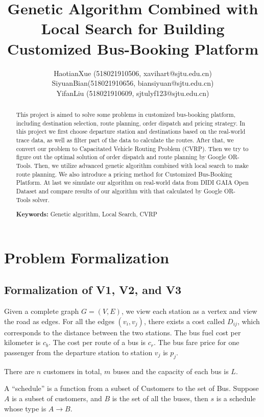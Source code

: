 \documentclass{llncs}
\title{Genetic Algorithm Combined with Local Search for Building Customized Bus-Booking Platform}
\author{HaotianXue (518021910506, xavihart@sjtu.edu.cn) \\ 
SiyuanBian(518021910656, biansiyuan@sjtu.edu.cn) \\
YifanLiu (518021910609, sjtulyf123@sjtu.edu.cn)}
\institute{Department of Computer Science, \\ Shanghai Jiao Tong University, Shanghai, China}
\begin{document}



\maketitle
\begin{abstract}\vspace{-5mm}
This project is aimed to solve some problems in customized bus-booking platform, including destination selection, route planning, order dispatch and pricing strategy. In this project we first choose departure station and destinations based on the real-world trace data, as well as filter part of the data to calculate the routes. After that, we convert our problem to Capacitated Vehicle Routing Problem (CVRP). Then we try to figure out the optimal solution of order dispatch and route planning by Google OR-Tools. Then, we utilize advanced genetic algorithm combined with local search to make route planning. We also introduce a pricing method for Customized Bus-Booking Platform. At last we simulate our algorithm on real-world data from DIDI GAIA Open Dataset and compare results of our algorithm with that calculated by Google OR-Tools solver.

\textbf{Keywords:} Genetic algorithm, Local Search, CVRP
\end{abstract}



\section{Problem Formalization}
\subsection{Formalization of V1, V2, and V3}
Given a complete graph $G = (V, E)$, we view each station as a vertex and view the road as edges. For all the edges $(v_i, v_j)$, there exists a cost called $D_{ij}$, which corresponds to the distance between the two stations. The bus fuel cost per kilometer is $c_b$. The cost per route of a bus is $c_r$. The bus fare price for one passenger from the departure station to station $v_j$ is $p_j$. 

There are $n$ customers in total, $m$ buses and the capacity of each bus is $L$.

A ``schedule'' is a function from a subset of Customers to the set of Bus. Suppose $A$ is a subset of customers, and $B$ is the set of all the buses, then $s$ is a schedule whose type is $A \rightarrow B$.
\end{document}
